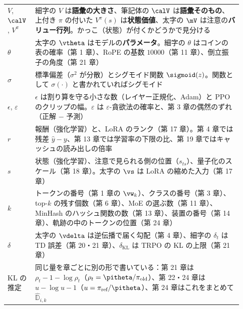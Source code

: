 \begin{minipage}{\linewidth}
\begin{tabular}{>{\raggedright\arraybackslash}p{0.10\linewidth}>{\raggedright\arraybackslash}p{0.83\linewidth}}
$V$, $\calV$, $V^\pi$ & 細字の $V$ は\textbf{語彙の大きさ}、筆記体の $\calV$ は\textbf{語彙そのもの}、上付き $\pi$ の付いた $V^\pi(s)$ は\textbf{状態価値}、太字の $\mV$ は注意の\textbf{バリュー行列}。かっこ（状態）が付くかどうかで見分ける \\
$\theta$ & 太字の $\vtheta$ はモデルの\textbf{パラメータ}。細字の $\theta$ はコインの表の確率（第 1 章）、RoPE の基数 $10000$（第 11 章）、倒立振子の角度（第 21 章） \\
$\sigma$ & 標準偏差（$\sigma^2$ が分散）とシグモイド関数 $\sigmoid(z)$。関数として $\sigma(\cdot)$ と書かれていればシグモイド \\
$\epsilon$, $\varepsilon$ & $\epsilon$ は割り算を守る小さな数（レイヤー正規化、Adam）と PPO のクリップの幅。$\varepsilon$ は $\varepsilon$-貪欲法の確率と、第 3 章の偶然のずれ（正解 $-$ 予測） \\
$r$ & 報酬（強化学習）と、LoRA のランク（第 17 章）。第 4 章では残差 $\hat y-y$、第 13 章では学習率の下限の比、第 19 章ではキャッシュの読み出しの倍率 \\
$s$ & 状態（強化学習）、注意で見られる側の位置（$s_{ts}$）、量子化のスケール（第 18 章）。太字の $\vs$ は LoRA の縮めた入力（第 17 章） \\
$k$ & トークンの番号（第 1 章の $\vw_k$）、クラスの番号（第 3 章）、top-$k$ の残す個数（第 6 章）、MoE の選ぶ数（第 11 章）、MinHash のハッシュ関数の数（第 13 章）、装置の番号（第 14 章）、軌跡の中のトークンの位置（第 24 章） \\
$\delta$ & 太字の $\vdelta$ は逆伝播で届く勾配（第 4 章）、細字の $\delta_t$ は TD 誤差（第 20・21 章）、$\delta_{\mathrm{KL}}$ は TRPO の KL の上限（第 21 章） \\
KL の推定 & 同じ量を章ごとに別の形で書いている：第 21 章は $\rho_t-1-\log\rho_t$（$\rho_t=\pitheta/\pi_{\text{old}}$）、第 22・24 章は $u-\log u-1$（$u=\pi_{\text{ref}}/\pitheta$）、第 24 章はこれをまとめて $\hat{\mathbb{D}}_{i,k}$ \\
\bottomrule
\end{tabular}
\end{minipage}\par\medskip
